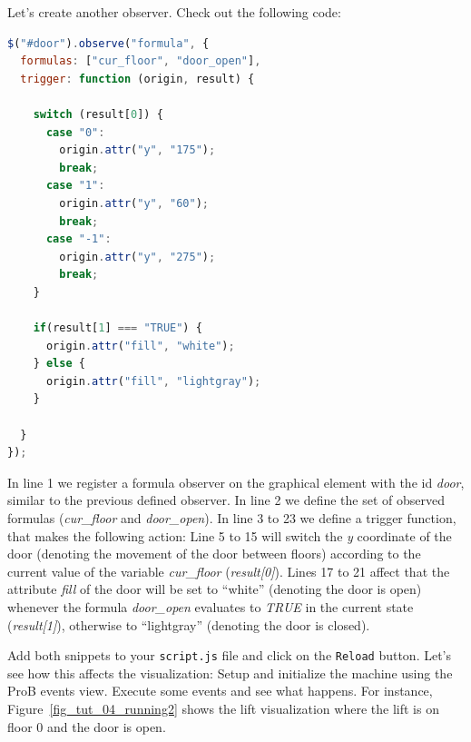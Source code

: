 Let's create another observer.
Check out the following code:

\begin{lstlisting}[language=JavaScript, caption={Formula Observer for the Lift Door (JavaScript)}]
$("#door").observe("formula", {
  formulas: ["cur_floor", "door_open"],
  trigger: function (origin, result) {
    
    switch (result[0]) {
      case "0":
        origin.attr("y", "175");
        break;
      case "1":
        origin.attr("y", "60");
        break;
      case "-1":
        origin.attr("y", "275");
        break;
    }
    
    if(result[1] === "TRUE") {
      origin.attr("fill", "white");
    } else {
      origin.attr("fill", "lightgray");
    }
    
  }
});
\end{lstlisting}

In line 1 we register a formula observer on the graphical element with the id \textit{door}, similar to the previous defined observer.
In line 2 we define the set of observed formulas (\textit{cur\_floor} and \textit{door\_open}).
In line 3 to 23 we define a trigger function, that makes the following action:
Line 5 to 15 will switch the \textit{y} coordinate of the door (denoting the movement of the door between floors) according to the current value of the variable \textit{cur\_floor} (\textit{result[0]}).
Lines 17 to 21 affect that the attribute \textit{fill} of the door will be set to ``white'' (denoting the door is open) whenever the formula \textit{door\_open} evaluates to \textit{TRUE} in the current state (\textit{result[1]}), otherwise to ``lightgray'' (denoting the door is closed).

Add both snippets to your \texttt{script.js} file and click on the \texttt{Reload} button.
Let's see how this affects the visualization:
Setup and initialize the machine using the ProB events view.
Execute some events and see what happens.
For instance, Figure~\ref{fig_tut_04_running2} shows the lift visualization where the lift is on floor 0 and the door is open.

